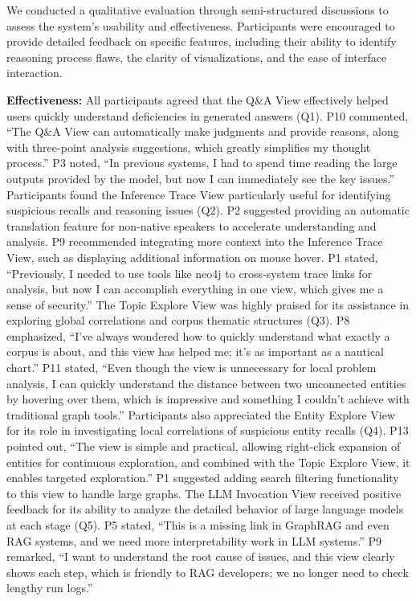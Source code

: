 We conducted a qualitative evaluation through semi-structured discussions to assess the system's usability and effectiveness. Participants were encouraged to provide detailed feedback on specific features, including their ability to identify reasoning process flaws, the clarity of visualizations, and the ease of interface interaction.

\textbf{Effectiveness:} All participants agreed that the Q\&A View effectively helped users quickly understand deficiencies in generated answers (Q1). P10 commented, ``The Q\&A View can automatically make judgments and provide reasons, along with three-point analysis suggestions, which greatly simplifies my thought process.'' P3 noted, ``In previous systems, I had to spend time reading the large outputs provided by the model, but now I can immediately see the key issues.''
Participants found the Inference Trace View particularly useful for identifying suspicious recalls and reasoning issues (Q2). P2 suggested providing an automatic translation feature for non-native speakers to accelerate understanding and analysis. P9 recommended integrating more context into the Inference Trace View, such as displaying additional information on mouse hover. P1 stated, ``Previously, I needed to use tools like neo4j to cross-system trace links for analysis, but now I can accomplish everything in one view, which gives me a sense of security.''
The Topic Explore View was highly praised for its assistance in exploring global correlations and corpus thematic structures (Q3). P8 emphasized, ``I've always wondered how to quickly understand what exactly a corpus is about, and this view has helped me; it's as important as a nautical chart.'' P11 stated, ``Even though the view is unnecessary for local problem analysis, I can quickly understand the distance between two unconnected entities by hovering over them, which is impressive and something I couldn't achieve with traditional graph tools.''
Participants also appreciated the Entity Explore View for its role in investigating local correlations of suspicious entity recalls (Q4). P13 pointed out, ``The view is simple and practical, allowing right-click expansion of entities for continuous exploration, and combined with the Topic Explore View, it enables targeted exploration.'' P1 suggested adding search filtering functionality to this view to handle large graphs.
The LLM Invocation View received positive feedback for its ability to analyze the detailed behavior of large language models at each stage (Q5). P5 stated, ``This is a missing link in GraphRAG and even RAG systems, and we need more interpretability work in LLM systems.'' P9 remarked, ``I want to understand the root cause of issues, and this view clearly shows each step, which is friendly to RAG developers; we no longer need to check lengthy run logs.''

